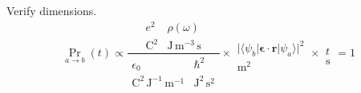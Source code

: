 Verify dimensions.
\begin{equation*}
\Pr_{a\rightarrow b}(t)\propto
\frac{\begin{matrix}
e^2 & \rho(\omega)
\\
\text{C}^2 & \text{J}\,\text{m}^{-3}\,\text{s}
\end{matrix}}
{\begin{matrix}
\epsilon_0 & \hbar^2
\\
\text{C}^2\,\text{J}^{-1}\,\text{m}^{-1} & \text{J}^2\,\text{s}^2
\end{matrix}}
\times
\begin{matrix}
\\
\bigl|\langle\psi_b|\boldsymbol{\epsilon}\cdot\mathbf r|\psi_a\rangle\bigr|^2
\\
\text{m}^2
\end{matrix}
\times
\begin{matrix}
\\
t
\\
\text{s}
\end{matrix}
=1
\end{equation*}


